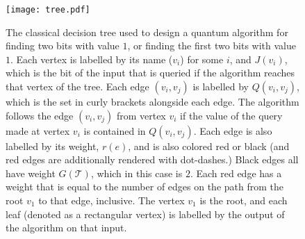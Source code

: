 \documentclass[cleveref, autoref, thm-restate,11pt]{article}
\theoremstyle{definition}
\newcommand{\sop}[1]{{\mathcal #1}}
\begin{document}
\begin{figure}[h]
\centering
\texttt{[image: tree.pdf]}
\caption{The classical decision tree used to design a quantum algorithm for
 finding two bits with value $1$, or finding the first two bits with value
 $1$. Each vertex is labelled by its name ($v_i$) for some $i$, and $J
 (v_i)$, which is the bit of the input that is queried if the algorithm
 reaches that vertex of the tree. Each edge $(v_i,v_j)$ is labelled by $Q
 (v_i,v_j)$, which is the set in curly brackets alongside each edge. The algorithm
 follows the edge $(v_i,v_j)$  from vertex $v_i$ if the value of the query
 made at vertex $v_i$ is contained in $Q(v_i,v_j)$. Each edge is also labelled
 by its weight, $r(e)$, and is also colored red or black (and red edges are
 additionally rendered with dot-dashes.) Black edges all have weight $G
 (\sop T)$, which in this case is $2$. Each red edge has a weight that is
 equal to the number of edges on the path from the root $v_1$ to that edge,
 inclusive. The vertex $v_1$ is the root, and each leaf (denoted as a rectangular vertex) is labelled by the 
 output of the algorithm on that input.}
\label{fig:tree}
\end{figure}
\end{document}
